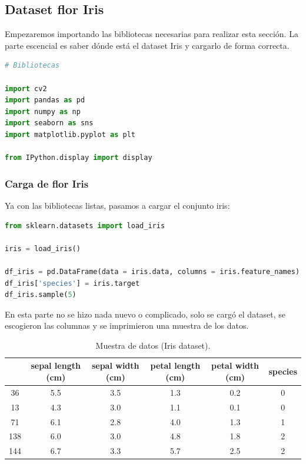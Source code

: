 \subsection{Dataset flor Iris}

Empezaremos importando las bibliotecas necesarias para realizar esta sección. 
La parte escencial es saber dónde está el dataset Iris y cargarlo de forma 
correcta.

\begin{lstlisting}[language = python, caption = {Carga de bibliotecas.}]
# Bibliotecas 

import cv2
import pandas as pd
import numpy as np 
import seaborn as sns
import matplotlib.pyplot as plt

from IPython.display import display
\end{lstlisting}

\subsubsection{Carga de flor Iris}

Ya con las bibliotecas listas, pasamos a cargar el conjunto iris:

\begin{lstlisting}[language = python, caption = {Carga del conjunto Iris.}]
from sklearn.datasets import load_iris

iris = load_iris()

df_iris = pd.DataFrame(data = iris.data, columns = iris.feature_names)
df_iris['species'] = iris.target
df_iris.sample(5)
\end{lstlisting}

En esta parte no se hizo nada nuevo o complicado, solo se cargó el dataset, 
se escogieron las columnas y se imprimieron una muestra de los datos.

\begin{table}[H]
\centering
\begin{tabular}{cccccc}
\hline
 & sepal length (cm) & sepal width (cm) & petal length (cm) & petal width (cm) & species \\
\hline
36 & 5.5 & 3.5 & 1.3 & 0.2 & 0 \\
13 & 4.3 & 3.0 & 1.1 & 0.1 & 0 \\
71 & 6.1 & 2.8 & 4.0 & 1.3 & 1 \\
138 & 6.0 & 3.0 & 4.8 & 1.8 & 2 \\
144 & 6.7 & 3.3 & 5.7 & 2.5 & 2 \\
\hline
\end{tabular}
\caption{Muestra de datos (Iris dataset).}
\end{table}

